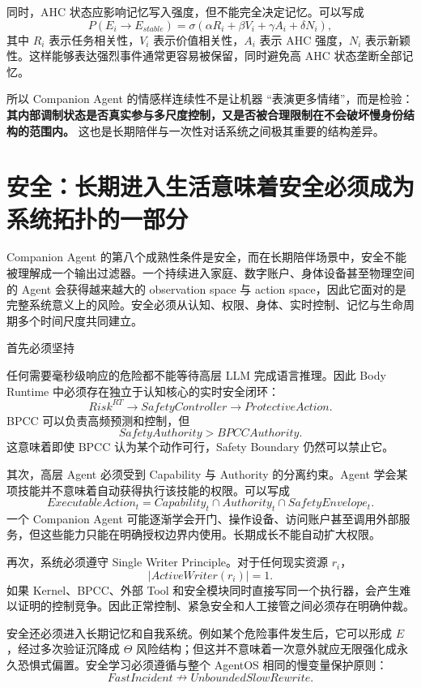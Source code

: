 同时，AHC 状态应影响记忆写入强度，但不能完全决定记忆。可以写成
\[
P(E_i\rightarrow E_{stable})
=
\sigma
\left(
\alpha R_i+
\beta V_i+
\gamma A_i+
\delta N_i
\right),
\]
其中 $R_i$ 表示任务相关性，$V_i$ 表示价值相关性，$A_i$ 表示 AHC 强度，$N_i$ 表示新颖性。这样能够表达强烈事件通常更容易被保留，同时避免高 AHC 状态垄断全部记忆。

所以 Companion Agent 的情感样连续性不是让机器 ``表演更多情绪''，而是检验：\textbf{其内部调制状态是否真实参与多尺度控制，又是否被合理限制在不会破坏慢身份结构的范围内。} 这也是长期陪伴与一次性对话系统之间极其重要的结构差异。

\section{安全：长期进入生活意味着安全必须成为系统拓扑的一部分}

Companion Agent 的第八个成熟性条件是安全，而在长期陪伴场景中，安全不能被理解成一个输出过滤器。一个持续进入家庭、数字账户、身体设备甚至物理空间的 Agent 会获得越来越大的 observation space 与 action space，因此它面对的是完整系统意义上的风险。安全必须从认知、权限、身体、实时控制、记忆与生命周期多个时间尺度共同建立。

首先必须坚持
\begin{statementbox}
\centering
{}
\end{statementbox}
任何需要毫秒级响应的危险都不能等待高层 LLM 完成语言推理。因此 Body Runtime 中必须存在独立于认知核心的实时安全闭环：
\[
Risk^{RT}
\rightarrow
SafetyController
\rightarrow
ProtectiveAction .
\]
BPCC 可以负责高频预测和控制，但
\[
SafetyAuthority
>
BPCCAuthority.
\]
这意味着即使 BPCC 认为某个动作可行，Safety Boundary 仍然可以禁止它。

其次，高层 Agent 必须受到 Capability 与 Authority 的分离约束。Agent 学会某项技能并不意味着自动获得执行该技能的权限。可以写成
\[
ExecutableAction_t
=
Capability_t
\cap
Authority_t
\cap
SafetyEnvelope_t.
\]
一个 Companion Agent 可能逐渐学会开门、操作设备、访问账户甚至调用外部服务，但这些能力只能在明确授权边界内使用。长期成长不能自动扩大权限。

再次，系统必须遵守 Single Writer Principle。对于任何现实资源 $r_i$，
\[
\left|
ActiveWriter(r_i)
\right|
=1.
\]
如果 Kernel、BPCC、外部 Tool 和安全模块同时直接写同一个执行器，会产生难以证明的控制竞争。因此正常控制、紧急安全和人工接管之间必须存在明确仲裁。

安全还必须进入长期记忆和自我系统。例如某个危险事件发生后，它可以形成 $E$，经过多次验证沉降成 $\Theta$ 风险结构；但这并不意味着一次意外就应无限强化成永久恐惧式偏置。安全学习必须遵循与整个 AgentOS 相同的慢变量保护原则：
\[
FastIncident
\nrightarrow
UnboundedSlowRewrite.
\]


